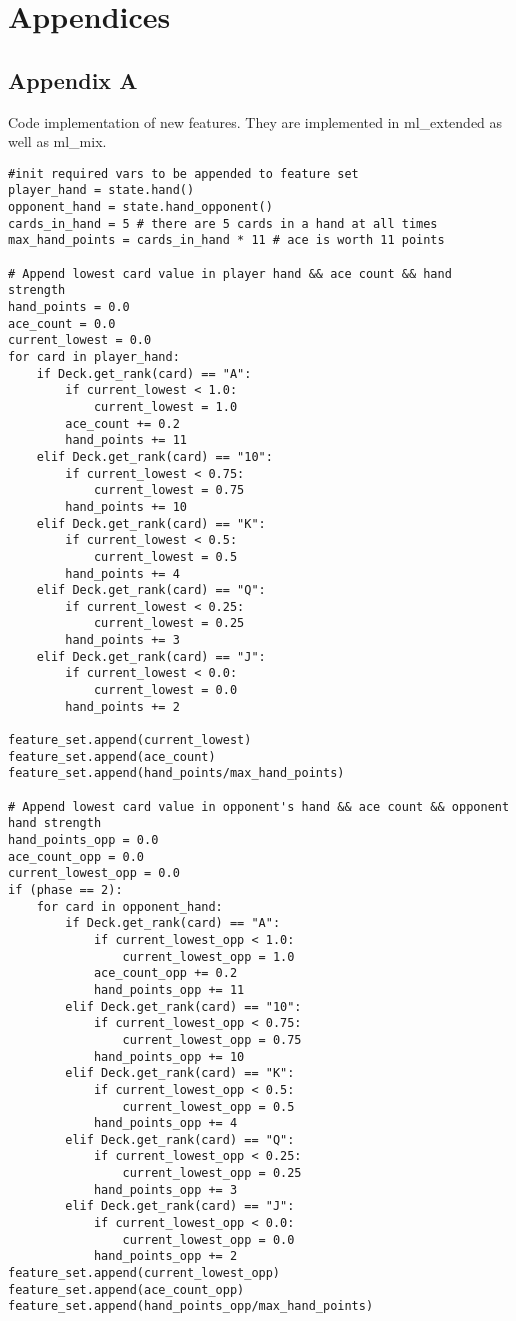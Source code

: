 \documentclass[master]{subfiles}
\begin{document}
\section{Appendices}
\subsection{Appendix A}
Code implementation of new features. They are implemented in ml\_extended as well as ml\_mix.
\begin{Verbatim}
#init required vars to be appended to feature set
player_hand = state.hand()
opponent_hand = state.hand_opponent()
cards_in_hand = 5 # there are 5 cards in a hand at all times
max_hand_points = cards_in_hand * 11 # ace is worth 11 points
    
# Append lowest card value in player hand && ace count && hand strength
hand_points = 0.0
ace_count = 0.0
current_lowest = 0.0
for card in player_hand:
    if Deck.get_rank(card) == "A":
        if current_lowest < 1.0:
            current_lowest = 1.0
        ace_count += 0.2
        hand_points += 11
    elif Deck.get_rank(card) == "10":
        if current_lowest < 0.75:
            current_lowest = 0.75
        hand_points += 10
    elif Deck.get_rank(card) == "K":
        if current_lowest < 0.5:
            current_lowest = 0.5
        hand_points += 4
    elif Deck.get_rank(card) == "Q":
        if current_lowest < 0.25:
            current_lowest = 0.25
        hand_points += 3
    elif Deck.get_rank(card) == "J":
        if current_lowest < 0.0:
            current_lowest = 0.0
        hand_points += 2

feature_set.append(current_lowest)
feature_set.append(ace_count)
feature_set.append(hand_points/max_hand_points)

# Append lowest card value in opponent's hand && ace count && opponent hand strength
hand_points_opp = 0.0
ace_count_opp = 0.0
current_lowest_opp = 0.0
if (phase == 2):
    for card in opponent_hand:
        if Deck.get_rank(card) == "A":
            if current_lowest_opp < 1.0:
                current_lowest_opp = 1.0
            ace_count_opp += 0.2
            hand_points_opp += 11
        elif Deck.get_rank(card) == "10":
            if current_lowest_opp < 0.75:
                current_lowest_opp = 0.75
            hand_points_opp += 10
        elif Deck.get_rank(card) == "K":
            if current_lowest_opp < 0.5:
                current_lowest_opp = 0.5
            hand_points_opp += 4
        elif Deck.get_rank(card) == "Q":
            if current_lowest_opp < 0.25:
                current_lowest_opp = 0.25
            hand_points_opp += 3
        elif Deck.get_rank(card) == "J":
            if current_lowest_opp < 0.0:
                current_lowest_opp = 0.0
            hand_points_opp += 2
feature_set.append(current_lowest_opp)
feature_set.append(ace_count_opp)
feature_set.append(hand_points_opp/max_hand_points)


\end{Verbatim}
\end{document}
